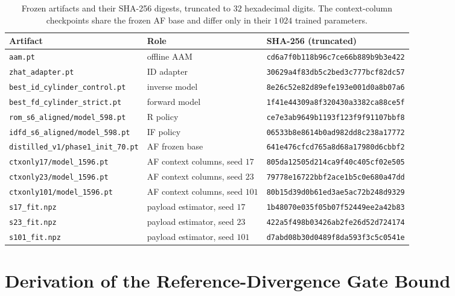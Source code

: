 \begin{table}[H]
  \centering
  \caption{Frozen artifacts and their SHA-256 digests, truncated to $32$
  hexadecimal digits. The context-column checkpoints share the frozen AF base
  and differ only in their $1\,024$ trained parameters.}
  \label{tab:app:hashes}
  \scriptsize
  \begin{tabular}{lll}
    \toprule
    Artifact & Role & SHA-256 (truncated) \\
    \midrule
    \texttt{aam.pt} & offline AAM & \texttt{cd6a7f0b118b96c7ce66b889b9b3e422} \\
    \texttt{zhat\_adapter.pt} & ID adapter & \texttt{30629a4f83db5c2bed3c777bcf82dc57} \\
    \texttt{best\_id\_cylinder\_control.pt} & inverse model & \texttt{8e26c52e82d89efe193e001d0a8b07a6} \\
    \texttt{best\_fd\_cylinder\_strict.pt} & forward model & \texttt{1f41e44309a8f320430a3382ca88ce5f} \\
    \midrule
    \texttt{rom\_s6\_aligned/model\_598.pt} & R policy & \texttt{ce7e3ab9649b1193f123f9f91107bbf8} \\
    \texttt{idfd\_s6\_aligned/model\_598.pt} & IF policy & \texttt{06533b8e8614b0ad982dd8c238a17772} \\
    \texttt{distilled\_v1/phase1\_init\_70.pt} & AF frozen base & \texttt{641e476cfcd765a8d68a17980d6cbbf2} \\
    \texttt{ctxonly17/model\_1596.pt} & AF context columns, seed $17$ & \texttt{805da12505d214ca9f40c405cf02e505} \\
    \texttt{ctxonly23/model\_1596.pt} & AF context columns, seed $23$ & \texttt{79778e16722bbf2ace1b5c0e680a47dd} \\
    \texttt{ctxonly101/model\_1596.pt} & AF context columns, seed $101$ & \texttt{80b15d39d0b61ed3ae5ac72b248d9329} \\
    \texttt{s17\_fit.npz} & payload estimator, seed $17$ & \texttt{1b48070e035f05b07f52449ee2a42b83} \\
    \texttt{s23\_fit.npz} & payload estimator, seed $23$ & \texttt{422a5f498b03426ab2fe26d52d724174} \\
    \texttt{s101\_fit.npz} & payload estimator, seed $101$ & \texttt{d7abd08b30d0489f8da593f3c5c0541e} \\
    \bottomrule
  \end{tabular}
\end{table}

\section{Derivation of the Reference-Divergence Gate Bound}
\label{app:kl-bound}

